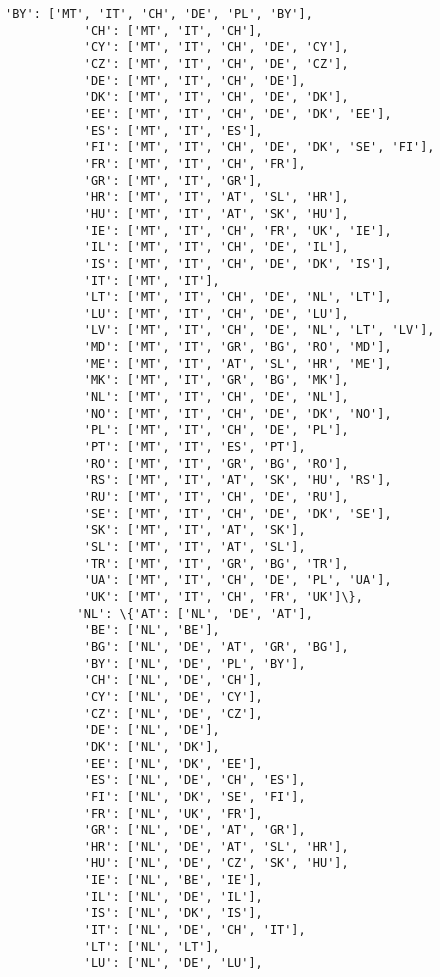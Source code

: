 \documentclass[11pt]{article}
\begin{document}
\begin{Verbatim}[commandchars=\\\{\}]
           'BY': ['MT', 'IT', 'CH', 'DE', 'PL', 'BY'],
           'CH': ['MT', 'IT', 'CH'],
           'CY': ['MT', 'IT', 'CH', 'DE', 'CY'],
           'CZ': ['MT', 'IT', 'CH', 'DE', 'CZ'],
           'DE': ['MT', 'IT', 'CH', 'DE'],
           'DK': ['MT', 'IT', 'CH', 'DE', 'DK'],
           'EE': ['MT', 'IT', 'CH', 'DE', 'DK', 'EE'],
           'ES': ['MT', 'IT', 'ES'],
           'FI': ['MT', 'IT', 'CH', 'DE', 'DK', 'SE', 'FI'],
           'FR': ['MT', 'IT', 'CH', 'FR'],
           'GR': ['MT', 'IT', 'GR'],
           'HR': ['MT', 'IT', 'AT', 'SL', 'HR'],
           'HU': ['MT', 'IT', 'AT', 'SK', 'HU'],
           'IE': ['MT', 'IT', 'CH', 'FR', 'UK', 'IE'],
           'IL': ['MT', 'IT', 'CH', 'DE', 'IL'],
           'IS': ['MT', 'IT', 'CH', 'DE', 'DK', 'IS'],
           'IT': ['MT', 'IT'],
           'LT': ['MT', 'IT', 'CH', 'DE', 'NL', 'LT'],
           'LU': ['MT', 'IT', 'CH', 'DE', 'LU'],
           'LV': ['MT', 'IT', 'CH', 'DE', 'NL', 'LT', 'LV'],
           'MD': ['MT', 'IT', 'GR', 'BG', 'RO', 'MD'],
           'ME': ['MT', 'IT', 'AT', 'SL', 'HR', 'ME'],
           'MK': ['MT', 'IT', 'GR', 'BG', 'MK'],
           'NL': ['MT', 'IT', 'CH', 'DE', 'NL'],
           'NO': ['MT', 'IT', 'CH', 'DE', 'DK', 'NO'],
           'PL': ['MT', 'IT', 'CH', 'DE', 'PL'],
           'PT': ['MT', 'IT', 'ES', 'PT'],
           'RO': ['MT', 'IT', 'GR', 'BG', 'RO'],
           'RS': ['MT', 'IT', 'AT', 'SK', 'HU', 'RS'],
           'RU': ['MT', 'IT', 'CH', 'DE', 'RU'],
           'SE': ['MT', 'IT', 'CH', 'DE', 'DK', 'SE'],
           'SK': ['MT', 'IT', 'AT', 'SK'],
           'SL': ['MT', 'IT', 'AT', 'SL'],
           'TR': ['MT', 'IT', 'GR', 'BG', 'TR'],
           'UA': ['MT', 'IT', 'CH', 'DE', 'PL', 'UA'],
           'UK': ['MT', 'IT', 'CH', 'FR', 'UK']\},
          'NL': \{'AT': ['NL', 'DE', 'AT'],
           'BE': ['NL', 'BE'],
           'BG': ['NL', 'DE', 'AT', 'GR', 'BG'],
           'BY': ['NL', 'DE', 'PL', 'BY'],
           'CH': ['NL', 'DE', 'CH'],
           'CY': ['NL', 'DE', 'CY'],
           'CZ': ['NL', 'DE', 'CZ'],
           'DE': ['NL', 'DE'],
           'DK': ['NL', 'DK'],
           'EE': ['NL', 'DK', 'EE'],
           'ES': ['NL', 'DE', 'CH', 'ES'],
           'FI': ['NL', 'DK', 'SE', 'FI'],
           'FR': ['NL', 'UK', 'FR'],
           'GR': ['NL', 'DE', 'AT', 'GR'],
           'HR': ['NL', 'DE', 'AT', 'SL', 'HR'],
           'HU': ['NL', 'DE', 'CZ', 'SK', 'HU'],
           'IE': ['NL', 'BE', 'IE'],
           'IL': ['NL', 'DE', 'IL'],
           'IS': ['NL', 'DK', 'IS'],
           'IT': ['NL', 'DE', 'CH', 'IT'],
           'LT': ['NL', 'LT'],
           'LU': ['NL', 'DE', 'LU'],

\end{Verbatim}
\end{document}
